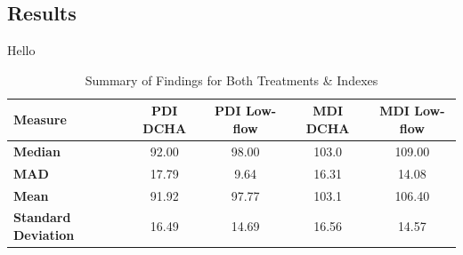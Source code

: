 \documentclass{article}
\begin{document}
\begin{enumerate}
		\subsection*{Results}
		Hello 
		\begin{table}[h!]
			\centering
			\footnotesize
			\caption{Summary of Findings for Both Treatments \& Indexes}
			\label{tab:summary_statistics}
			\begin{tabular}{lcccc}
			\toprule
			\textbf{Measure}          & \textbf{PDI DCHA} & \textbf{PDI Low-flow} & \textbf{MDI DCHA} & \textbf{MDI Low-flow} \\ 
			\midrule
			\textbf{Median}           & 92.00             & 98.00                & 103.0             & 109.00              \\ 
			\textbf{MAD}              & 17.79             & 9.64                 & 16.31             & 14.08               \\ 
			\textbf{Mean}             & 91.92             & 97.77                & 103.1             & 106.40              \\ 
			\textbf{Standard Deviation} & 16.49            & 14.69                & 16.56             & 14.57               \\ 
			\bottomrule
			\end{tabular}
		\end{table}
			
			
			
		
	\end{enumerate}
		
\end{document}
